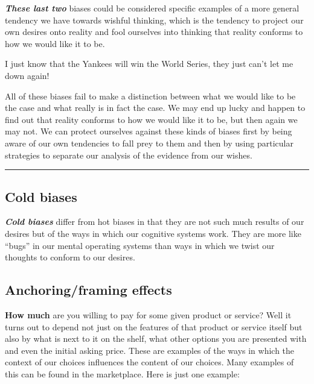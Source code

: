 \documentclass[]{book}
\makeatletter
\newenvironment{kframe}{%
\medskip{}
\setlength{\fboxsep}{.8em}
 \def\at@end@of@kframe{}%
 \ifinner\ifhmode%
  \def\at@end@of@kframe{\end{minipage}}%
  \begin{minipage}{\columnwidth}%
 \fi\fi%
 \def\FrameCommand##1{\hskip\@totalleftmargin \hskip-\fboxsep
 \colorbox{shadecolor}{##1}\hskip-\fboxsep
     \hskip-\linewidth \hskip-\@totalleftmargin \hskip\columnwidth}%
 \MakeFramed {\advance\hsize-\width
   \@totalleftmargin\z@ \linewidth\hsize
   \@setminipage}}%
 {\par\unskip\endMakeFramed%
 \at@end@of@kframe}
\newenvironment{rmdblock}[1]
  {
  \begin{itemize}
  \renewcommand{\labelitemi}{
    \raisebox{-.7\height}[0pt][0pt]{
      {\setkeys{Gin}{width=3em,keepaspectratio}\texttt{[image: img/\#1]}}
    }
  }
  \setlength{\fboxsep}{1em}
  \begin{kframe}
  \item
  }
  {
  \end{kframe}
  \end{itemize}
  }
\newenvironment{rmdwarning}
  {\begin{rmdblock}{warning}}
  {\end{rmdblock}}
\makeatother
\begin{document}
\textbf{\emph{These last two}} biases could be considered specific examples of a more general tendency we have towards wishful thinking, which is the tendency to project our own desires onto reality and fool ourselves into thinking that reality conforms to how we would like it to be.

\begin{rmdwarning}
I just know that the Yankees will win the World Series, they just can't
let me down again!
\end{rmdwarning}

All of these biases fail to make a distinction between what we would like to be the case and what really is in fact the case. We may end up lucky and happen to find out that reality conforms to how we would like it to be, but then again we may not. We can protect ourselves against these kinds of biases first by being aware of our own tendencies to fall prey to them and then by using particular strategies to separate our analysis of the evidence from our wishes.

\begin{center}\rule{0.5\linewidth}{\linethickness}\end{center}

\hypertarget{cold-biases}{%
\subsection*{\texorpdfstring{\textbf{Cold biases}}{Cold biases}}\label{cold-biases}}


\textbf{\emph{Cold biases}} differ from hot biases in that they are not such much results of our desires but of the ways in which our cognitive systems work. They are more like ``bugs'' in our mental operating systems than ways in which we twist our thoughts to conform to our desires.

\hypertarget{anchoringframing-effects}{%
\subsection*{Anchoring/framing effects}\label{anchoringframing-effects}}


\textbf{How much} are you willing to pay for some given product or service? Well it turns out to depend not just on the features of that product or service itself but also by what is next to it on the shelf, what other options you are presented with and even the initial asking price. These are examples of the ways in which the context of our choices influences the content of our choices. Many examples of this can be found in the marketplace. Here is just one example:
\end{document}
